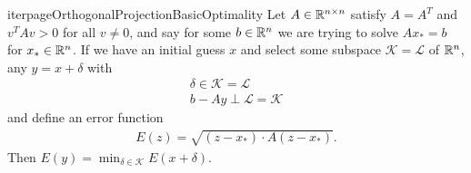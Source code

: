 \documentclass[11pt]{article}
\begin{document}
\begin{label proposition}{iterpageOrthogonalProjectionBasicOptimality}
Let $A \in \mathbb{R}^{n \times n}$ satisfy $A = A^T$ and $v^T A v > 0$ for all $v \neq 0$, and say for some $b \in \mathbb{R}^n$ we are trying to solve $A x_* = b$ for $x_* \in \mathbb{R}^n$. If we have an initial guess $x$ and select some subspace $\mathcal{K} = \mathcal{L}$ of $\mathbb{R}^n$, any $y = x + \delta$ with \begin{gather*}
\delta \in \mathcal{K} = \mathcal{L} \\
b - Ay \perp \mathcal{L} = \mathcal{K}
\end{gather*}
and define an error function \begin{gather*}
E(z) = \sqrt{(z - x_*) \cdot A(z - x_*)}.
\end{gather*}
Then $E(y) = \min_{\delta \in \mathcal K} E(x + \delta)$.
\end{label proposition}
\end{document}
